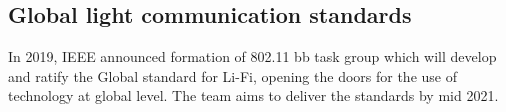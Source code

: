 \documentclass[notitlepage,hidelinks]{article}
\begin{document}
\subsection{Global light communication standards}

In 2019, IEEE announced formation of 802.11 bb task group which will develop
and ratify the Global standard for Li-Fi, opening the doors for the use of
technology at global level. 
The team aims to deliver the standards by mid 2021.


\printbibliography[heading=subbibliography]
\end{document}
